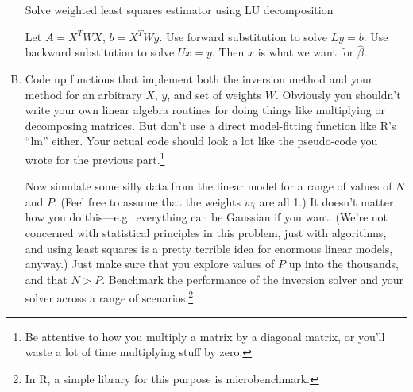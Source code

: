 \documentclass[11pt]{article}
\begin{document}
\begin{enumerate}[(A)]
\begin{algorithm}[H]
\caption{Solve weighted least squares estimator using LU decomposition}\label{alg:my_inverse}
\begin{algorithmic}
\State Let $A = X^T W X$, $b= X^T W y$.
\State Use forward substitution to solve $Ly = b$.
\State Use backward substitution to solve $Ux = y$. Then $x$ is what we want for $\hat{\beta}$.
\end{algorithmic}
\end{algorithm}

\bigskip 

\item Code up functions that implement both the inversion method and your method for an arbitrary $X$, $y$, and set of weights $W$.  Obviously you shouldn't write your own linear algebra routines for doing things like multiplying or decomposing matrices.  But don't use a direct model-fitting function like R's ``lm'' either.   Your actual code should look a lot like the pseudo-code you wrote for the previous part.\footnote{Be attentive to how you multiply a matrix by a diagonal matrix, or you'll waste a lot of time multiplying stuff by zero.}

Now simulate some silly data from the linear model for a range of values of $N$ and $P$.  (Feel free to assume that the weights $w_i$ are all 1.)  It doesn't matter how you do this---e.g.~everything can be Gaussian if you want.  (We're not concerned with statistical principles in this problem, just with algorithms, and using least squares is a pretty terrible idea for enormous linear models, anyway.)  Just make sure that you explore values of $P$ up into the thousands, and that $N > P$.  Benchmark the performance of the inversion solver and your solver across a range of scenarios.\footnote{In R, a simple library for this purpose is microbenchmark.}

\bigskip


\end{enumerate}
\end{document}
